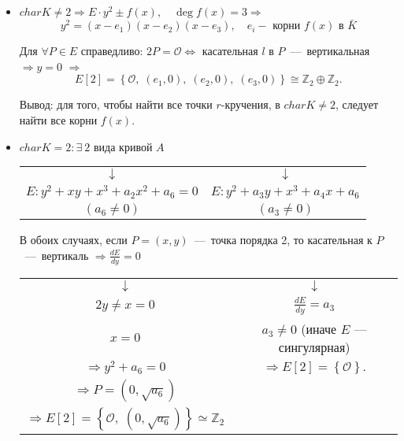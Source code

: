 \documentclass[12pt]{article}
\newcommand{\Z}{{{\mathbb Z}}}
\theoremstyle{definition}
\theoremstyle{definition}
\theoremstyle{definition}
\begin{document}
\begin{itemize}
	\item $charK \ne 2 \Rightarrow E \cdot {y^2} \pm f\left( x \right),\quad \deg f\left( x \right) = 3 \Rightarrow $
	$$
	{y^2} = \left( {x - {e_1}} \right)\left( {x - {e_2}} \right)\left( {x - {e_3}} \right),\quad {e_i} - {\text{ корни }}f\left( x \right){\text{ в }}\bar{K}
	$$
	
	Для $\forall P \in E$ справедливо: $2P = \mathcal{O} \Leftrightarrow $ касательная $l$ в $P$~---~вертикальная $ \Rightarrow y = 0$ $ \Rightarrow $
	$$
	E\left[ 2 \right] = \left\{ \mathcal{O},\;\left( {{e_1},0} \right),\;\left( {{e_2},0} \right),\;\left( {{e_3},0} \right) \right\} \cong {\Z_2} \oplus {\Z_2}.
	$$
	
	Вывод: для того, чтобы найти все точки $r$-кручения, в $charK \ne 2$, следует найти все корни $f(x)$.
	
	\item $charK = 2: \exists\: 2\text{ вида кривой }A$

    \begin{center}
	\begin{tabular}{c c}
		$ \downarrow $ & $ \downarrow $ \\
		$E: {y^2} + xy + {x^3} + {a_2}{x^2} + {a_6} = 0$ \quad & $E:{y^2} + {a_3}y + {x^3} + {a_4}x + {a_6}$ \\
		$\left( {{a_6} \ne 0} \right)$ & $\left( {{a_3} \ne 0} \right)$ \\
	\end{tabular}
    \end{center}

	В обоих случаях, если $P = \left( {x,y} \right)$~---~точка порядка 2, то касательная к $P$~---~вертикаль $ \Rightarrow \frac{{dE}}{{dy}} = 0$

	\begin{center}
	\begin{tabular}{c c}
		$ \downarrow $ & $ \downarrow $ \\
		$2y \ne x = 0$ & $\frac{{dE}}{{dy}} = {a_3}$ \\
		$x = 0$ & ${a_3} \ne 0$ (иначе $E$ — сингулярная) \\
		$ \Rightarrow {y^2} + {a_6} = 0$ & $ \Rightarrow E\left[ 2 \right] = \left\{\mathcal{O}\right\}.$ \\
		$ \Rightarrow P = \left( {0, \sqrt {{a_6}} } \right)$ & \\
		$ \Rightarrow E\left[ 2 \right] = \left\{ {\mathcal{O},\;\left( {0,\sqrt {a_6} } \right)} \right\} \simeq {\Z_2}$ & \\
	\end{tabular}
	\end{center}
\end{itemize}
\end{document}
